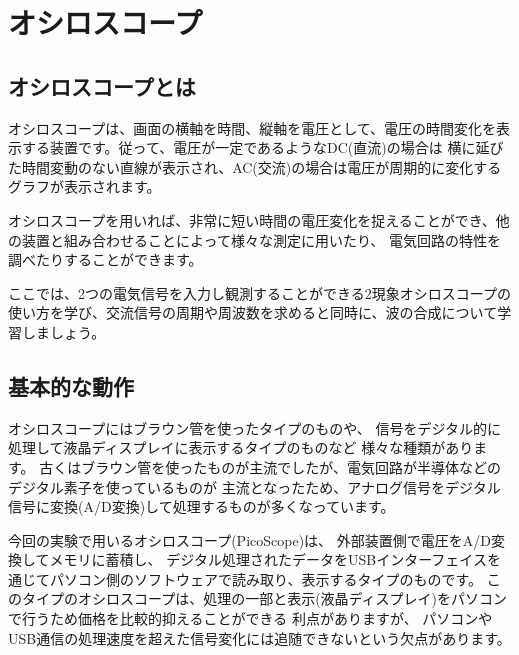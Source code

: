 %
%

\section{オシロスコープ}

\subsection{オシロスコープとは}

オシロスコープは、画面の横軸を時間、縦軸を電圧として、電圧の時間変化を表示する装置です。従って、電圧が一定であるようなDC(直流)の場合は
横に延びた時間変動のない直線が表示され、AC(交流)の場合は電圧が周期的に変化するグラフが表示されます。

オシロスコープを用いれば、非常に短い時間の電圧変化を捉えることができ、他の装置と組み合わせることによって様々な測定に用いたり、
電気回路の特性を調べたりすることができます。


ここでは、2つの電気信号を入力し観測することができる2現象オシロスコープの使い方を学び、交流信号の周期や周波数を求めると同時に、波の合成について学習しましょう。




\subsection{基本的な動作}

オシロスコープにはブラウン管を使ったタイプのものや、
信号をデジタル的に処理して液晶ディスプレイに表示するタイプのものなど
様々な種類があります。
古くはブラウン管を使ったものが主流でしたが、電気回路が半導体などのデジタル素子を使っているものが
主流となったため、アナログ信号をデジタル信号に変換(A/D変換)して処理するものが多くなっています。

今回の実験で用いるオシロスコープ(PicoScope)は、
外部装置側で電圧をA/D変換してメモリに蓄積し、
デジタル処理されたデータをUSBインターフェイスを通じてパソコン側のソフトウェアで読み取り、表示するタイプのものです。
このタイプのオシロスコープは、処理の一部と表示(液晶ディスプレイ)をパソコンで行うため価格を比較的抑えることができる
利点がありますが、
パソコンやUSB通信の処理速度を超えた信号変化には追随できないという欠点があります。



